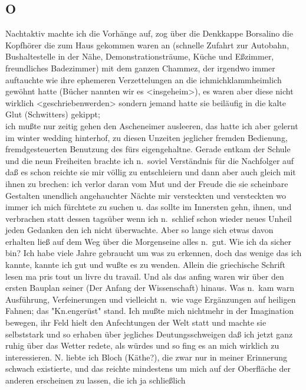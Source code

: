 \documentclass[
]{article}
\author{}
\date{\vspace{-2.5em}}
\begin{document}
\subsection{O}\label{o}

Nachtaktiv machte ich die Vorhänge auf, zog über die Denkkappe Borsalino
die Kopfhörer die zum Haus gekommen waren an (schnelle Zufahrt zur
Autobahn, Bushaltestelle in der Nähe, Demonstrationsträume, Küche und
Eßzimmer, freundliches Badezimmer) mit dem ganzen Chammez, der irgendwo
immer auftauchte wie ihre ephemeren Verzettelungen an die
ichmichklammheimlich gewöhnt hatte (Bücher nannten wir es
\textless insgeheim\textgreater), es waren aber diese nicht wirklich
\textless geschriebenwerden\textgreater{} sondern jemand hatte sie
beiläufig in die kalte Glut (Schwitters) gekippt;\\
ich mußte nur zeitig gehen den Ascheneimer ausleeren, das hatte ich aber
gelernt im winter wedding hinterhof, zu diesen Unzeiten jeglicher
fremden Bedienung, fremdgesteuerten Benutzung des für\textquotesingle s
eigengehaltne. Gerade entkam der Schule und die neun Freiheiten brachte
ich n.~soviel Verständnis für die Nachfolger auf daß es schon reichte
sie mir völlig zu entschleiern und dann aber auch gleich mit ihnen zu
brechen: ich verlor daran vom Mut und der Freude die sie scheinbare
Gestalten unendlich angehauchter Nächte mir versteckten und versteckten
wo immer ich mich fürchtete zu suchen u. das sollte im Innersten gehn,
ihnen, und verbrachen statt dessen tagsüber wenn ich n.~schlief schon
wieder neues Unheil jeden Gedanken den ich nicht überwachte. Aber so
lange sich etwas davon erhalten ließ auf dem Weg über die Morgenseine
alles n.~gut. Wie ich da sicher bin? Ich habe viele Jahre gebraucht um
was zu erkennen, doch das wenige das ich kannte, kannte ich gut und
wußte es zu wenden. Allein die griechische Schrift lesen
m\textquotesingle a pris tout un livre du travail. Und als das anfing
waren wir über den ersten Bauplan seiner (Der Anfang der Wissenschaft)
hinaus. Was n.~kam warn Ausführung, Verfeinerungen und vielleicht n.~wie
vage Ergänzungen auf heiligen Fahnen; das "Kn.engerüst" stand. Ich mußte
mich nichtmehr in der Imagination bewegen, ihr Feld hielt den
Anfechtungen der Welt statt und machte sie selbststark und so erhaben
über jegliches Deutungsschweigen daß ich jetzt ganz ruhig über das
Wetter redete, als würdes und so fing es an mich wirklich zu
interessieren. N. liebte ich Bloch (Käthe?), die zwar nur in meiner
Erinnerung schwach existierte, und das reichte mindestens um mich auf
der Oberfläche der anderen erscheinen zu lassen, die ich ja schließlich
\end{document}
